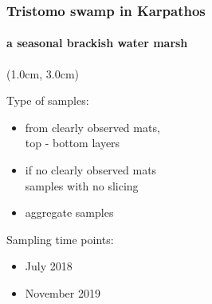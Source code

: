 \documentclass{beamer}
\begin{document}
\begin{darkframes}
\begin{frame}
      \end{frame}

   \end{darkframes}

   \begin{frame}
      \frametitle{Tristomo swamp in Karpathos}
      \framesubtitle{a seasonal brackish water marsh}


      \begin{textblock*}{6cm}(1.0cm, 3.0cm)
         \small 

         Type of samples: 

         \begin{itemize}
            \item from clearly observed mats, \\ top - bottom layers
            \item if no clearly observed mats \\ samples with no slicing 
            \item aggregate samples
         \end{itemize}

         \bigskip

         Sampling time points: \\
         \begin{itemize}
            \item July 2018 
            \item November 2019
         \end{itemize}


      \end{textblock*}

   \end{frame}
\end{document}
